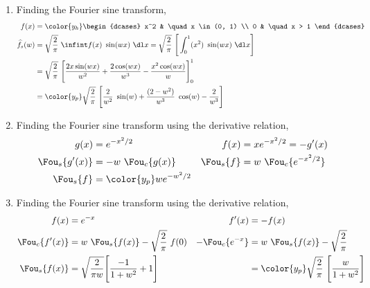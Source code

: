 \begin{enumerate}
    \item Finding the Fourier sine transform,
          \begin{align}
              f(x)             & = \color{y_h} \begin{dcases}
                                                   x^2 & \quad x \in (0, 1) \\
                                                   0   & \quad x > 1
                                               \end{dcases}                 \\
              \widehat{f}_s(w) & = \sqrt{\frac{2}{\pi}}\ \infint f(x)\ \sin(wx)\ \dl x
              = \sqrt{\frac{2}{\pi}}\ \Bigg[\int_{0}^{1} (x^2)
              \ \sin(wx)\ \dl x\Bigg]                                                   \\
                               & = \sqrt{\frac{2}{\pi}}\ \Bigg[ \frac{2x \sin(wx)}{w^2}
              + \frac{2\cos(wx)}{w^3} - \frac{x^2\cos(wx)}{w} \Bigg]_0^1                \\
                               & = \color{y_p} \sqrt{\frac{2}{\pi}}
              \ \Bigg[ \frac{2}{w^2}\ \sin(w) + \frac{(2 - w^2)}{w^3}\ \cos(w)
                  - \frac{2}{w^3} \Bigg]
          \end{align}

    \item Finding the Fourier sine transform using the derivative relation,
          \begin{align}
              g(x)            & = e^{-x^2/2}               &
              f(x)            & = xe^{-x^2/2} = -g'(x)       \\
              \Fou_s\{g'(x)\} & = -w\ \Fou_c\{g(x)\}       &
              \Fou_s\{f\}     & = w\ \Fou_c\{e^{-x^2/2}\}    \\
              \Fou_s\{f\}     & = \color{y_p} w e^{-w^2/2}
          \end{align}

    \item Finding the Fourier sine transform using the derivative relation,
          \begin{align}
              f(x)              & = e^{-x}                                           &
              f'(x)             & = -f(x)                                              \\
              \Fou_c\{f'(x)\}   & = w\ \Fou_s\{f(x)\} - \sqrt{\frac{2}{\pi}}\ f(0)   &
              -\Fou_c\{e^{-x}\} & = w\ \Fou_s\{f(x)\} - \sqrt{\frac{2}{\pi}}           \\
              \Fou_s\{f(x)\}    & = \sqrt{\frac{2}{\pi w}} \Bigg[ \frac{-1}{1 + w^2}
              + 1\Bigg]         &
                                & = \color{y_p} \sqrt{\frac{2}{\pi}}\
              \Bigg[\frac{w}{1 + w^2}\Bigg]
          \end{align}


\end{enumerate}
